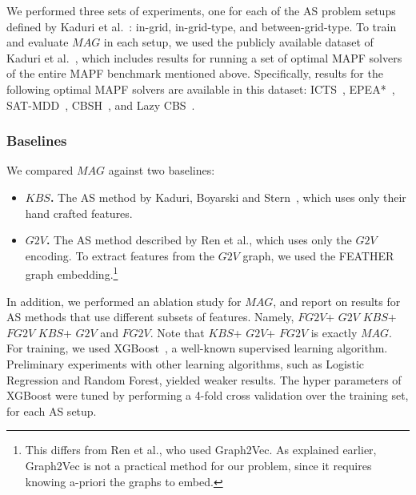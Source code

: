 \documentclass{ecai}
\newcommand{\shortcite}[1]{\cite{#1}}
\newcommand{\gtv}[1]{\ensuremath{\textit{G2V}}\xspace}
\newcommand{\fgtv}[1]{\ensuremath{\textit{FG2V}}\xspace}
\newcommand{\kaduri}[1]{\ensuremath{\textit{KBS}}\xspace}
\newcommand{\mapfgas}[1]{\ensuremath{\textit{MAG}}\xspace}
\begin{document}
We performed three sets of experiments, one for each of the AS problem setups defined by Kaduri et al.~\cite{kaduri2021experimental}: in-grid, in-grid-type, and between-grid-type. 
To train and evaluate \mapfgas\ in each setup, we used the publicly available dataset of Kaduri et al.~\shortcite{kaduri2021experimental}, 
which includes results for running a set of optimal MAPF solvers of the entire MAPF benchmark mentioned above. 
Specifically, results for the following optimal MAPF solvers are available in this dataset: ICTS~\cite{sharon2013increasing}, EPEA*~\cite{goldenberg2014enhanced}, SAT-MDD~\cite{surynek2016efficient}, CBSH~\cite{felner2018adding}, and Lazy CBS~\cite{gange2019lazy}. 

\subsubsection{Baselines}
We compared \mapfgas\ against two baselines: 
\begin{itemize}
    \item \textbf{\kaduri\ .} The AS method by Kaduri, Boyarski and Stern~\cite{kaduri2020algorithm}, which uses only their hand crafted features. 
    \item \textbf{\gtv\ .} The AS method described by Ren et al.\cite{ren2021mapfast}, which uses only the \gtv\ encoding. To extract features from the \gtv\ graph, we used the FEATHER graph embedding.\footnote{This differs from Ren et al., who used Graph2Vec. As explained earlier, Graph2Vec is not a practical method for our problem, since it requires knowing a-priori the graphs to embed.}
\end{itemize}
In addition, we performed an ablation study for \mapfgas\ , and report on results for AS methods that use different subsets of features. Namely, \fgtv\ + \gtv\, 
\kaduri\ + \fgtv\, 
\kaduri\ + \gtv\, 
and \fgtv\ .
Note that \kaduri\ + \gtv\ + \fgtv\ is exactly \mapfgas\ .
For training, we used XGBoost~\cite{chen2016xgboost}, a well-known supervised learning algorithm. 
Preliminary experiments with other learning algorithms, such as Logistic Regression and Random Forest, yielded weaker results. %
The hyper parameters of XGBoost were tuned by performing a  4-fold cross validation over the training set, for each AS setup. 
\end{document}
